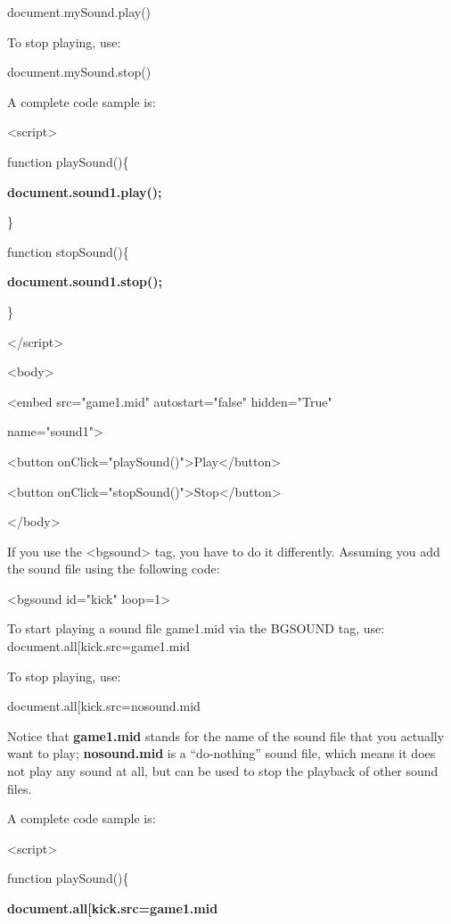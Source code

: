 \documentclass[
]{article}
\begin{document}
document.mySound.play()

To stop playing, use:

document.mySound.stop()

A complete code sample is:

\textless script\textgreater{}

function playSound()\{

\textbf{document.sound1.play();}

\}

function stopSound()\{

\textbf{document.sound1.stop();}

\}

\textless/script\textgreater{}

\textless body\textgreater{}

\textless embed src="game1.mid" autostart="false" hidden="True"

name="sound1"\textgreater{}

\textless button
onClick="playSound()"\textgreater Play\textless/button\textgreater{}

\textless button
onClick="stopSound()"\textgreater Stop\textless/button\textgreater{}

\textless/body\textgreater{}

If you use the \textless bgsound\textgreater{} tag, you have to do it
differently. Assuming you add the sound file using the following code:

\textless bgsound id="kick" loop=1\textgreater{}

To start playing a sound file game1.mid via the BGSOUND tag, use:
document.all{[}\textquotesingle kick\textquotesingle{]}.src=\textquotesingle game1.mid\textquotesingle{}

To stop playing, use:

document.all{[}\textquotesingle kick\textquotesingle{]}.src=\textquotesingle nosound.mid\textquotesingle{}

Notice that \textbf{game1.mid} stands for the name of the sound file
that you actually want to play; \textbf{nosound.mid} is a ``do-nothing''
sound file, which means it does not play any sound at all, but can be
used to stop the playback of other sound files.

A complete code sample is:

\textless script\textgreater{}

function playSound()\{

\textbf{document.all{[}\textquotesingle kick\textquotesingle{]}.src=\textquotesingle game1.mid\textquotesingle{}}
\end{document}

